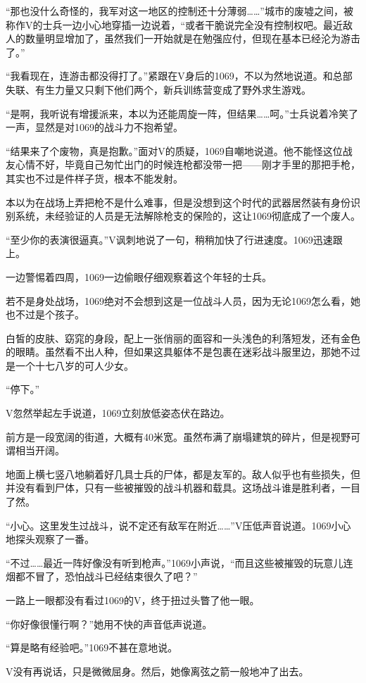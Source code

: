 “那也没什么奇怪的，我军对这一地区的控制还十分薄弱……”城市的废墟之间，被称作V的士兵一边小心地穿插一边说着，“或者干脆说完全没有控制权吧。最近敌人的数量明显增加了，虽然我们一开始就是在勉强应付，但现在基本已经沦为游击了。”

“我看现在，连游击都没得打了。”紧跟在V身后的1069，不以为然地说道。和总部失联、有生力量又只剩下他们两个，新兵训练营变成了野外求生游戏。

“是啊，我听说有增援派来，本以为还能周旋一阵，但结果……呵。”士兵说着冷笑了一声，显然是对1069的战斗力不抱希望。

“结果来了个废物，真是抱歉。”面对V的质疑，1069自嘲地说道。他不能怪这位战友心情不好，毕竟自己匆忙出门的时候连枪都没带一把——刚才手里的那把手枪，其实也不过是件样子货，根本不能发射。

本以为在战场上弄把枪不是什么难事，但是没想到这个时代的武器居然装有身份识别系统，未经验证的人员是无法解除枪支的保险的，这让1069彻底成了一个废人。

“至少你的表演很逼真。”V讽刺地说了一句，稍稍加快了行进速度。1069迅速跟上。

一边警惕着四周，1069一边偷眼仔细观察着这个年轻的士兵。

若不是身处战场，1069绝对不会想到这是一位战斗人员，因为无论1069怎么看，她也不过是个孩子。

白皙的皮肤、窈窕的身段，配上一张俏丽的面容和一头浅色的利落短发，还有金色的眼睛。虽然看不出人种，但如果这具躯体不是包裹在迷彩战斗服里边，那她不过是一个十七八岁的可人少女。

“停下。”

V忽然举起左手说道，1069立刻放低姿态伏在路边。

前方是一段宽阔的街道，大概有40米宽。虽然布满了崩塌建筑的碎片，但是视野可谓相当开阔。

地面上横七竖八地躺着好几具士兵的尸体，都是友军的。敌人似乎也有些损失，但并没有看到尸体，只有一些被摧毁的战斗机器和载具。这场战斗谁是胜利者，一目了然。

“小心。这里发生过战斗，说不定还有敌军在附近……”V压低声音说道。1069小心地探头观察了一番。

“不过……最近一阵好像没有听到枪声。”1069小声说，“而且这些被摧毁的玩意儿连烟都不冒了，恐怕战斗已经结束很久了吧？”

一路上一眼都没有看过1069的V，终于扭过头瞥了他一眼。

“你好像很懂行啊？”她用不快的声音低声说道。

“算是略有经验吧。”1069不甚在意地说。

V没有再说话，只是微微屈身。然后，她像离弦之箭一般地冲了出去。

